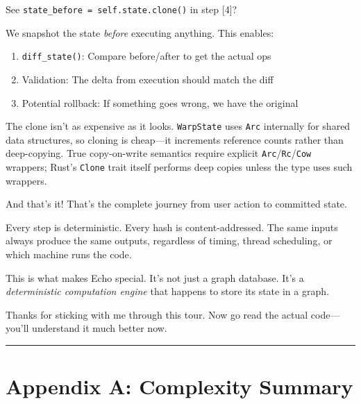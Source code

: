 \documentclass[11pt]{book}
\newenvironment{directors}
{\begin{mdframed}[
  linecolor=blue!60,
  linewidth=2pt,
  leftline=true,
  rightline=false,
  topline=false,
  bottomline=false,
  backgroundcolor=blue!3,
  innerleftmargin=12pt,
  innerrightmargin=10pt,
  innertopmargin=8pt,
  innerbottommargin=8pt,
  skipabove=12pt,
  skipbelow=12pt
]\small\sffamily\color{blue!70!black}}
{\end{mdframed}}
\begin{document}
\begin{directors}
See \texttt{state\_before = self.state.clone()} in step [4]?

We snapshot the state \emph{before} executing anything. This enables:
\begin{enumerate}
\item \texttt{diff\_state()}: Compare before/after to get the actual ops
\item Validation: The delta from execution should match the diff
\item Potential rollback: If something goes wrong, we have the original
\end{enumerate}

The clone isn't as expensive as it looks. \texttt{WarpState} uses \texttt{Arc} internally for shared data structures, so cloning is cheap---it increments reference counts rather than deep-copying. True copy-on-write semantics require explicit \texttt{Arc}/\texttt{Rc}/\texttt{Cow} wrappers; Rust's \texttt{Clone} trait itself performs deep copies unless the type uses such wrappers.
\end{directors}

\begin{directors}
And that's it! That's the complete journey from user action to committed state.

Every step is deterministic. Every hash is content-addressed. The same inputs always produce the same outputs, regardless of timing, thread scheduling, or which machine runs the code.

This is what makes Echo special. It's not just a graph database. It's a \emph{deterministic computation engine} that happens to store its state in a graph.

Thanks for sticking with me through this tour. Now go read the actual code---you'll understand it much better now.
\end{directors}

\begin{center}\rule{0.5\linewidth}{0.5pt}\end{center}

\section{Appendix A: Complexity Summary}\label{appendix-a-complexity-summary}
\end{document}
